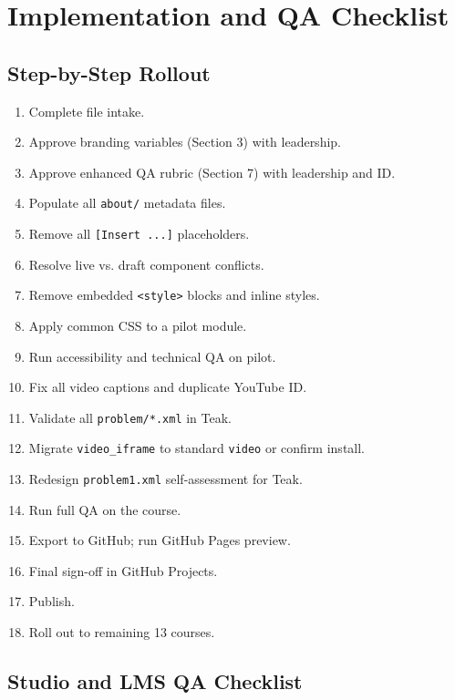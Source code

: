 \chapter{Implementation and QA Checklist}

\section{Step-by-Step Rollout}

\begin{enumerate}
  \item Complete file intake.
  \item Approve branding variables (Section 3) with leadership.
  \item Approve enhanced QA rubric (Section 7) with leadership and ID.
  \item Populate all \texttt{about/} metadata files.
  \item Remove all \texttt{[Insert ...]} placeholders.
  \item Resolve live vs. draft component conflicts.
  \item Remove embedded \texttt{<style>} blocks and inline styles.
  \item Apply common CSS to a pilot module.
  \item Run accessibility and technical QA on pilot.
  \item Fix all video captions and duplicate YouTube ID.
  \item Validate all \texttt{problem/*.xml} in Teak.
  \item Migrate \texttt{video\_iframe} to standard \texttt{video} or confirm install.
  \item Redesign \texttt{problem1.xml} self-assessment for Teak.
  \item Run full QA on the course.
  \item Export to GitHub; run GitHub Pages preview.
  \item Final sign-off in GitHub Projects.
  \item Publish.
  \item Roll out to remaining 13 courses.
\end{enumerate}

\section{Studio and LMS QA Checklist}

